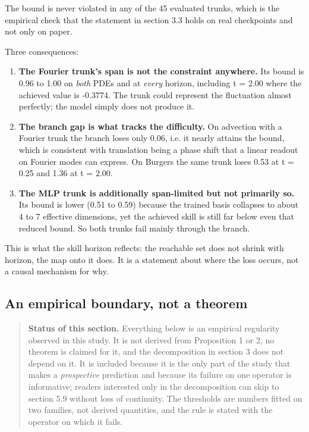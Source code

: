 \documentclass[preprint,12pt]{elsarticle}
\begin{document}
The bound is never violated in any of the 45 evaluated trunks, which is the empirical check that the statement in section 3.3 holds on real checkpoints and not only on paper.

Three consequences:

\begin{enumerate}
\item \textbf{The Fourier trunk's span is not the constraint anywhere.} Its bound is 0.96 to 1.00 on \emph{both} PDEs and at \emph{every} horizon, including t = 2.00 where the achieved value is -0.3774. The trunk could represent the fluctuation almost perfectly; the model simply does not produce it.
\item \textbf{The branch gap is what tracks the difficulty.} On advection with a Fourier trunk the branch loses only 0.06, i.e. it nearly attains the bound, which is consistent with translation being a phase shift that a linear readout on Fourier modes can express. On Burgers the same trunk loses 0.53 at t = 0.25 and 1.36 at t = 2.00.
\item \textbf{The MLP trunk is additionally span-limited but not primarily so.} Its bound is lower (0.51 to 0.59) because the trained basis collapses to about 4 to 7 effective dimensions, yet the achieved skill is still far below even that reduced bound. So both trunks fail mainly through the branch.
\end{enumerate}


This is what the skill horizon reflects: the reachable set does not shrink with horizon, the map onto it does. It is a statement about where the loss occurs, not a causal mechanism for why.

\subsection{An empirical boundary, not a theorem}

\begin{quote}
\textbf{Status of this section.} Everything below is an empirical regularity observed in this study. It is not derived from Proposition 1 or 2, no theorem is claimed for it, and the decomposition in section 3 does not depend on it. It is included because it is the only part of the study that makes a \emph{prospective} prediction and because its failure on one operator is informative; readers interested only in the decomposition can skip to section 5.9 without loss of continuity. The thresholds are numbers fitted on two families, not derived quantities, and the rule is stated with the operator on which it fails.
\end{quote}
\end{document}
